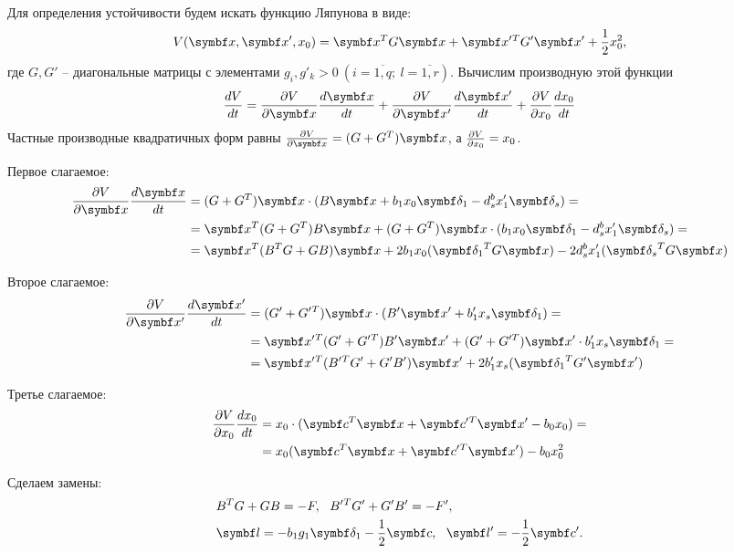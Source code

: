 Для определения устойчивости будем искать функцию Ляпунова в виде:
\begin{equation}
    V(\mb{x}, \mb{x'}, x_0) = \mb{x}^T G \mb{x} + \mb{x'}{}^T G' \mb{x'} + \frac{1}{2} x^2_0,
\end{equation}
где \(G, G'\) -- диагональные матрицы с элементами \(g_i, g'_k > 0 ~ (i=\overline{1,q}; ~ l=\overline{1,r})\). Вычислим производную этой функции
\begin{equation*}
    \frac{dV}{dt} = \frac{\D V}{\D \mb{x}} \frac{d \mb{x}}{d t} + \frac{\D V}{\D \mb{x'}} \frac{d \mb{x'}}{d t} + \frac{\D V}{\D x_0} \frac{d x_0}{d t}
\end{equation*}
Частные производные квадратичных форм равны \( \frac{\D V}{\D \mb{x}} = (G + G^T) \mb{x} \), а \(\frac{\partial V}{\partial x_0} = x_0 \).

Первое слагаемое:
\[ 
\begin{split}
    \frac{\D V}{\D \mb{x}} \frac{d \mb{x}}{d t} &= (G + G^T) \mb{x} \cdot (B \mb{x} + b_1 x_0 \mb{\delta_1} - d^b_s x'_1 \mb{\delta_s}) = \\
    &= \mb{x}^T (G + G^T) B \mb{x} + (G + G^T) \mb{x} \cdot (b_1 x_0 \mb{\delta_1} - d^b_s x'_1 \mb{\delta_s}) = \\
    &= \mb{x}^T (B^T G + G B) \mb{x} + 2 b_1 x_0 (\mb{\delta_1}^T G \mb{x}) - 2 d^b_s x'_1 (\mb{\delta_s}^T G \mb{x})
\end{split}
\]

Второе слагаемое:
\[ 
\begin{split}
    \frac{\D V}{\D \mb{x'}} \frac{d \mb{x'}}{d t} &= (G' + G'{}^T) \mb{x} \cdot (B' \mb{x'} + b'_1 x_s \mb{\delta_1}) = \\
    &= \mb{x'}{}^T (G' + G'{}^T) B' \mb{x'} + (G' + G'^T) \mb{x'} \cdot b'_1 x_s \mb{\delta_1} = \\
    &= \mb{x'}{}^T (B'{}^T G' + G' B') \mb{x'} + 2 b'_1 x_s (\mb{\delta_1}^T G' \mb{x'})
\end{split}
\]

Третье слагаемое:
\[ 
\begin{split}
    \frac{\D V}{\D x_0} \frac{d x_0}{d t} &= x_0 \cdot (\mb{c}^T \mb{x} + \mb{c'}{}^T \mb{x'} - b_0 x_0) = \\
    & = x_0(\mb{c}^T \mb{x} + \mb{c'}{}^T \mb{x'}) - b_0 x_0^2
\end{split}
\]

Сделаем замены:
\begin{equation}
    \begin{split}
        & B^T G + G B = -F, ~~ B'{}^T G' + G' B' = -F', \\
        & \mb{l} = -b_1 g_1 \mb{\delta_1} - \frac{1}{2} \mb{c}, ~~ \mb{l'} = -\frac{1}{2} \mb{c'}.
    \end{split}
\end{equation}

